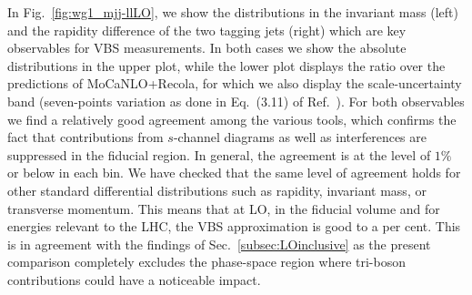 \documentclass[twocolumn,epjc3]{svjour3} %
\begin{document}
    In Fig.~\ref{fig:wg1_mjj-llLO}, we show the distributions in the invariant mass (left) and the rapidity difference of the two tagging jets (right) which are key observables for VBS measurements.
    In both cases we show the absolute distributions in the upper plot, while the lower plot displays the ratio over the predictions of {\sc MoCaNLO+Recola}, 
    for which we also display the scale-uncertainty band (seven-points variation as done in Eq.~(3.11) of Ref.~\cite{Biedermann:2017bss}).
    For both observables we find a relatively good agreement among the various tools, which confirms the fact that contributions from $s$-channel diagrams as well as interferences are suppressed in the fiducial region.
    In general, the agreement is at the level of $1\%$ or below in each bin.
    We have checked that the same level of agreement holds for other standard differential distributions such as rapidity, invariant mass, or transverse momentum.
    This means that at LO, in the fiducial volume and for energies relevant to the LHC, the VBS approximation is good to a per cent.
    This is in agreement with the findings of Sec.~\ref{subsec:LOinclusive} as the present comparison completely excludes the phase-space region where tri-boson contributions could have a noticeable impact.
\end{document}
